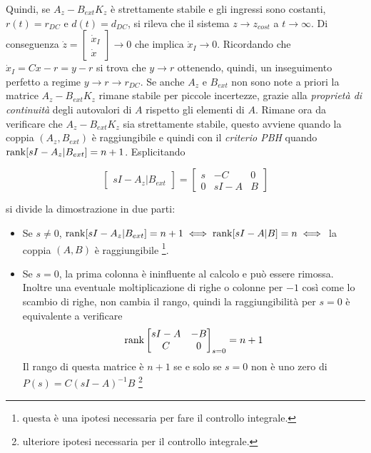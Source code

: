 		\noindent Quindi, se $A_z-B_{ext}K_z$ è strettamente stabile e gli ingressi sono costanti, $r(t)=r_{DC}$ e $d(t)=d_{DC}$, si rileva che il sistema $z \to z_{cost}$ a $ t \to \infty$.
		\newline Di conseguenza $\dot{z}=\begin{bmatrix}\dot{x}_I \\ \dot{x}\end{bmatrix} \to 0$ che implica $\dot{x}_I \to 0$. Ricordando che $\dot{x}_I=Cx-r=y-r$ si trova che $y \to r$ ottenendo, quindi, un inseguimento perfetto a regime $y \to r \to r_{DC}$.  Se anche $A_z$ e $B_{ext}$ non sono note a priori la matrice $A_z-B_{ext}K_z$ rimane stabile per piccole incertezze, grazie alla \textit{proprietà di continuità} degli autovalori di $A$ rispetto gli elementi di $A$.	
		\newline Rimane ora da verificare che $A_z-B_{ext}K_z$ sia strettamente stabile, questo avviene quando la coppia $(A_z,B_{ext})$ è raggiungibile e quindi con il \textit{criterio PBH} quando $\operatorname*{rank}[sI-A_z|B_{ext}]=n+1$. Esplicitando
		
		\begin{equation}
			\begin{bmatrix}
				sI-A_z | B_{ext}
			\end{bmatrix}
			=
			\begin{bmatrix}
			s & -C   & 0 \\
			0 & sI-A & B 
			\end{bmatrix}
		\end{equation}
		
		\noindent si divide la dimostrazione in due parti:
		
		\begin{itemize}
			\item Se $s \ne 0$, $\operatorname*{rank}[sI-A_z|B_{ext}]=n+1 \iff \operatorname*{rank}[sI-A|B]=n \iff$ la coppia $(A,B)$ è raggiungibile \footnote{questa è una ipotesi necessaria per fare il controllo integrale.}.
			
			\item Se $s=0$, la prima colonna è ininfluente al calcolo e può essere rimossa. Inoltre una eventuale moltiplicazione di righe o colonne per $-1$ così come lo scambio di righe, non cambia il rango, quindi la raggiungibilità per $s=0$ è equivalente a verificare 
			\begin{equation*}
				\operatorname*{rank}
				\begin{bmatrix}
					sI-A & -B \\
					C    & 0 
				\end{bmatrix}_{s=0}
				=n+1
			\end{equation*}
			Il rango di questa matrice è $n+1$ se e solo se $s=0$ non è uno zero di $P(s)=C(sI-A)^{-1}B$ \footnote{ulteriore ipotesi necessaria per il controllo integrale.}
		\end{itemize}
		
